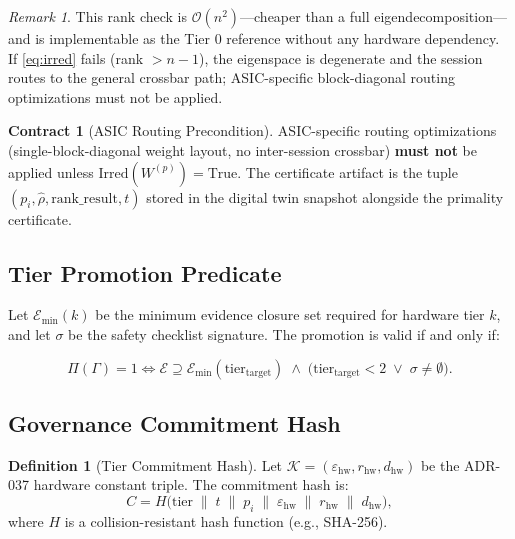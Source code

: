 \documentclass[12pt,letterpaper]{article}
\theoremstyle{plain}
\theoremstyle{definition}
\newtheorem{definition}[theorem]{Definition}
\newtheorem{contract}[theorem]{Contract}
\theoremstyle{remark}
\newtheorem{remark}[theorem]{Remark}
\begin{document}
\begin{remark}
This rank check is \(\mathcal{O}(n^2)\)---cheaper than a full
eigendecomposition---and is implementable as the Tier 0 reference without any
hardware dependency. If \cref{eq:irred} fails (rank \(> n-1\)), the eigenspace
is degenerate and the session routes to the general crossbar path; ASIC-specific
block-diagonal routing optimizations must not be applied.
\end{remark}

\begin{contract}[ASIC Routing Precondition]
ASIC-specific routing optimizations (single-block-diagonal weight layout,
no inter-session crossbar) \textbf{must not} be applied unless
\(\mathrm{Irred}(W^{(p)}) = \mathrm{True}\). The certificate artifact is the
tuple \((p_i, \hat{\rho}, \mathrm{rank\_result}, t)\) stored in the digital
twin snapshot alongside the primality certificate.
\end{contract}

\subsection{Tier Promotion Predicate}

Let \(\mathcal{E}_{\min}(k)\) be the minimum evidence closure set required for
hardware tier \(k\), and let \(\sigma\) be the safety checklist signature. The
promotion is valid if and only if:

\begin{equation}
  \Pi(\Gamma) = 1 \iff
  \mathcal{E} \supseteq \mathcal{E}_{\min}(\mathrm{tier}_{\mathrm{target}})
  \;\wedge\;
  \bigl(\mathrm{tier}_{\mathrm{target}} < 2 \;\vee\; \sigma \neq \emptyset\bigr). \label{eq:promotion}
\end{equation}

\subsection{Governance Commitment Hash}

\begin{definition}[Tier Commitment Hash]
Let \(\mathcal{K} = (\varepsilon_{\mathrm{hw}}, r_{\mathrm{hw}}, d_{\mathrm{hw}})\)
be the ADR-037 hardware constant triple. The commitment hash is:
\begin{equation}
  C = H\bigl(\mathrm{tier} \;\|\; t \;\|\; p_i \;\|\; \varepsilon_{\mathrm{hw}} \;\|\; r_{\mathrm{hw}} \;\|\; d_{\mathrm{hw}}\bigr), \label{eq:hash}
\end{equation}
where \(H\) is a collision-resistant hash function (e.g., SHA-256).
\end{definition}
\end{document}
